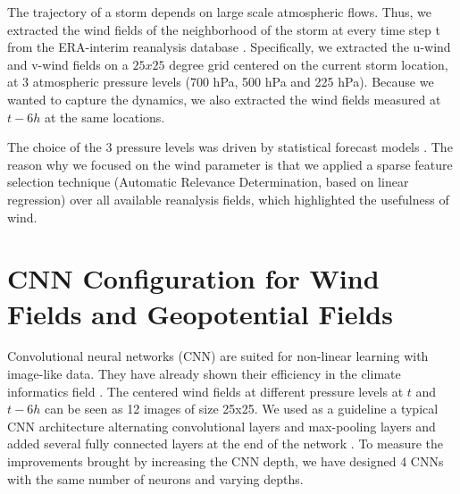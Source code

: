 The trajectory of a storm depends on large scale atmospheric flows. Thus, we extracted the wind fields of the neighborhood of the storm at every time step t from the ERA-interim reanalysis database \cite{dee2011era}. Specifically, we extracted the u-wind and v-wind fields on a $25x25$ degree grid centered on the current storm location, at 3 atmospheric pressure levels (700 hPa, 500 hPa and 225 hPa). Because we wanted to capture the dynamics, we also extracted the wind fields measured at $t - 6h$ at the same locations.

The choice of the 3 pressure levels was driven by statistical forecast models \cite{demaria2005further}. The reason why we focused on the wind parameter is that we applied a sparse feature selection technique (Automatic Relevance Determination, based on linear regression) over all available reanalysis fields, which highlighted the usefulness of wind.


\section{CNN Configuration for Wind Fields and Geopotential Fields}
Convolutional neural networks (CNN) are suited for non-linear learning with image-like data. They have already shown their efficiency in the climate informatics field \cite{xingjian2015convolutional, de2017deep,racah2017extremeweather}. The centered wind fields at different pressure levels at $t$ and $t-6h$ can be seen as 12 images of size 25x25. We used as a guideline a typical CNN architecture alternating convolutional layers and max-pooling layers and added several fully connected layers at the end of the network \cite{simonyan2014very}. To measure the improvements brought by increasing the CNN depth, we have designed 4 CNNs with the same number of neurons and varying depths. 


